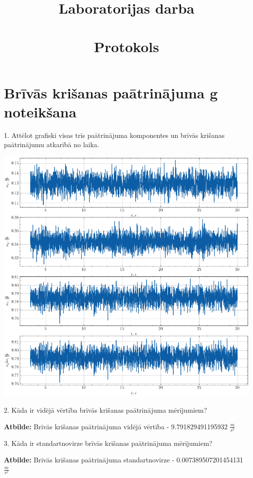 \documentclass[12pt]{article}
\title{\vspace{-1cm}\centering Laboratorijas darba \\[1ex] \large \say{Akselerometra datu apstrāde - Integrēšana un statistiskie aprēķini} \\ Protokols \vspace{-6em}}
\author{}
\date{}
\newlength\tindent
\renewcommand{\indent}{\hspace*{\tindent}}
\begin{document}
\maketitle

\section*{Brīvās krišanas paātrinājuma g noteikšana}

1. Attēlot grafiski visas trīs paātrinājuma komponentes un brīvās krišanas paātrinājumu atkarībā no laika.
\begin{center}
    \includegraphics[width=1\textwidth]{Brīvās krišanas paātrinājuma g noteikšana1.png}
\end{center}

2.	Kāda ir vidējā vērtība brīvās krišanas paātrinājuma mērījumiem?

\indent \textbf{Atbilde:} Brīvās krišanas paātrinājuma vidējā vērtība - 9.791829491195932 $\frac{m}{s^2}$

3.	Kāda ir standartnovirze brīvās krišanas paātrinājuma mērījumiem?

\indent \textbf{Atbilde:} Brīvās krišanas paātrinājuma standartnovirze - 0.007389507201454131 $\frac{m}{s^2}$
\end{document}
